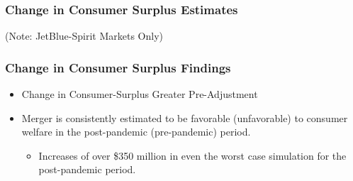 \documentclass[xcolor=dvipsnames]{beamer}
\begin{document}
    \begin{frame}
        \frametitle{Change in Consumer Surplus Estimates}
        \tiny
        \centering
{}

    (Note: JetBlue-Spirit Markets Only)
    \end{frame}

    \begin{frame}
        \frametitle{Change in Consumer Surplus Findings}
        \begin{itemize}
            \item Change in Consumer-Surplus Greater Pre-Adjustment
            \item Merger is consistently estimated to be favorable (unfavorable) to consumer welfare in the post-pandemic (pre-pandemic) period.
            \begin{itemize}
                \item Increases of over \$350 million in even the worst case simulation for the post-pandemic period.
            \end{itemize}
        \end{itemize}
    \end{frame}
\end{document}
